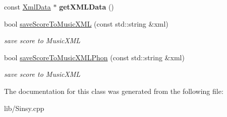 \begin{DoxyCompactItemize}
\item 
\hypertarget{classsinsy_1_1SinsyImpl_ab4aef01229731bd24f9cd8c1f98a5f39}{const \hyperlink{classsinsy_1_1XmlData}{\-Xml\-Data} $\ast$ {\bfseries get\-X\-M\-L\-Data} ()}\label{classsinsy_1_1SinsyImpl_ab4aef01229731bd24f9cd8c1f98a5f39}

\item 
\hypertarget{classsinsy_1_1SinsyImpl_ac7ffea79eb90ff782db69a9824aadcff}{bool \hyperlink{classsinsy_1_1SinsyImpl_ac7ffea79eb90ff782db69a9824aadcff}{save\-Score\-To\-Music\-X\-M\-L} (const std\-::string \&xml)}\label{classsinsy_1_1SinsyImpl_ac7ffea79eb90ff782db69a9824aadcff}

\begin{DoxyCompactList}\small\item\em save score to \-Music\-X\-M\-L \end{DoxyCompactList}\item 
\hypertarget{classsinsy_1_1SinsyImpl_a9b15d5674ac1189c9e9abd76cddcaa62}{bool \hyperlink{classsinsy_1_1SinsyImpl_a9b15d5674ac1189c9e9abd76cddcaa62}{save\-Score\-To\-Music\-X\-M\-L\-Phon} (const std\-::string \&xml)}\label{classsinsy_1_1SinsyImpl_a9b15d5674ac1189c9e9abd76cddcaa62}

\begin{DoxyCompactList}\small\item\em save score to \-Music\-X\-M\-L \end{DoxyCompactList}\end{DoxyCompactItemize}


\-The documentation for this class was generated from the following file\-:\begin{DoxyCompactItemize}
\item 
lib/\-Sinsy.\-cpp\end{DoxyCompactItemize}
